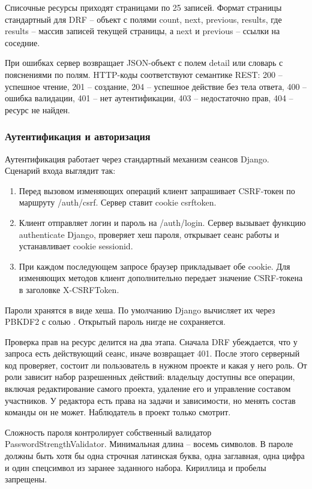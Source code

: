 Списочные ресурсы приходят страницами по 25 записей. Формат страницы стандартный для DRF -- объект с полями count, next, previous, results, где results -- массив записей текущей страницы, а next и previous -- ссылки на соседние.

При ошибках сервер возвращает JSON-объект с полем detail или словарь с пояснениями по полям. HTTP-коды соответствуют семантике REST: 200 -- успешное чтение, 201 -- создание, 204 -- успешное действие без тела ответа, 400 -- ошибка валидации, 401 -- нет аутентификации, 403 -- недостаточно прав, 404 -- ресурс не найден.

\subsubsection{Аутентификация и авторизация}

Аутентификация работает через стандартный механизм сеансов Django. Сценарий входа выглядит так:
\begin{enumerate}
    \item Перед вызовом изменяющих операций клиент запрашивает CSRF-токен по маршруту /auth/csrf. Сервер ставит cookie csrftoken.
    \item Клиент отправляет логин и пароль на /auth/login. Сервер вызывает функцию authenticate Django, проверяет хеш пароля, открывает сеанс работы и устанавливает cookie sessionid.
    \item При каждом последующем запросе браузер прикладывает обе cookie. Для изменяющих методов клиент дополнительно передает значение CSRF-токена в заголовке X-CSRFToken.
\end{enumerate}

Пароли хранятся в виде хеша. По умолчанию Django вычисляет их через PBKDF2 с солью \cite{art_hashing}. Открытый пароль нигде не сохраняется.

Проверка прав на ресурс делится на два этапа. Сначала DRF убеждается, что у запроса есть действующий сеанс, иначе возвращает 401. После этого серверный код проверяет, состоит ли пользователь в нужном проекте и какая у него роль. От роли зависит набор разрешенных действий: владельцу доступны все операции, включая редактирование самого проекта, удаление его и управление составом участников. У редактора есть права на задачи и зависимости, но менять состав команды он не может. Наблюдатель в проект только смотрит.

Сложность пароля контролирует собственный валидатор PasswordStrengthValidator. Минимальная длина -- восемь символов. В пароле должны быть хотя бы одна строчная латинская буква, одна заглавная, одна цифра и один спецсимвол из заранее заданного набора. Кириллица и пробелы запрещены.


